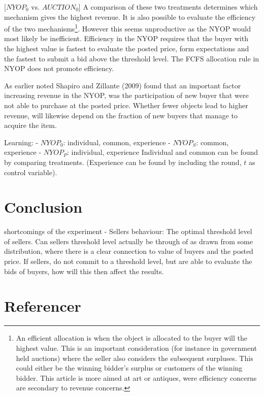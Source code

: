\documentclass[a4paper,12pt]{article}
\begin{document}
	[$NYOP_0$ vs. $AUCTION_0$]
	A comparison of these two treatments determines which mechanism gives the highest revenue. It is also possible to evaluate the efficiency of the two mechanisms\footnote{\label{footnote:efficient}An efficient allocation is when the object is allocated to the buyer will the highest value. This is an important consideration (for instance in government held auctions) where the seller also considers the subsequent surpluses. This could either be the winning bidder's surplus or customers of the winning bidder. This article is more aimed at art or antiques, were efficiency concerns are secondary to revenue concerns.}. However this seems unproductive as the NYOP would most likely be inefficient. Efficiency in the NYOP requires that the buyer with the highest value is fastest to evaluate the posted price, form expectations and the fastest to submit a bid above the threshold level. The FCFS allocation rule in NYOP does not promote efficiency. 
	
As earlier noted Shapiro and Zillante (2009) found that an important factor increasing revenue in the NYOP, was the participation of new buyer that were not able to purchase at the posted price. Whether fewer objects lead to higher revenue, will likewise depend on the fraction of new buyers that manage to acquire the item.

	Learning: 
	- $NYOP_0$: individual, common, experience
	- $NYOP_S$: common, experience
	- $NYOP_P$: individual, experience
	Individual and common can be found by comparing treatments. (Experience can be found by including the round, $t$ as control variable).
	
	\section{Conclusion}
			
	shortcomings of the experiment
	- Sellers behaviour: The optimal threshold level of sellers. Can sellers threshold level actually be through of as drawn from some distribution, where there is a clear connection to value of buyers and the posted price. If sellers, do not commit to a threshold level, but are able to evaluate the bids of buyers, how will this then affect the results.
	
			
	\newpage
	\appendix
	
	\begingroup
		\section{Referencer}
		
		\nocite{*}
		\renewcommand{\section}[2]{}%
		\raggedright
		
%
%
	\endgroup
	
\end{document}
